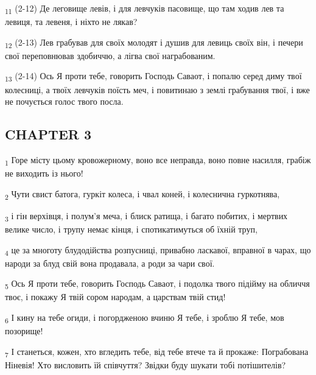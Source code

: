 \begin{tcolorbox}
\textsubscript{11} (2-12) Де леговище левів, і для левчуків пасовище, що там ходив лев та левиця, та левеня, і ніхто не лякав?
\end{tcolorbox}
\begin{tcolorbox}
\textsubscript{12} (2-13) Лев грабував для своїх молодят і душив для левиць своїх він, і печери свої переповнював здобиччю, а лігва свої награбованим.
\end{tcolorbox}
\begin{tcolorbox}
\textsubscript{13} (2-14) Ось Я проти тебе, говорить Господь Саваот, і попалю серед диму твої колесниці, а твоїх левчуків поїсть меч, і повитинаю з землі грабування твої, і вже не почується голос твого посла.
\end{tcolorbox}
\subsection{CHAPTER 3}
\begin{tcolorbox}
\textsubscript{1} Горе місту цьому кровожерному, воно все неправда, воно повне насилля, грабіж не виходить із нього!
\end{tcolorbox}
\begin{tcolorbox}
\textsubscript{2} Чути свист батога, гуркіт колеса, і чвал коней, і колеснична гуркотнява,
\end{tcolorbox}
\begin{tcolorbox}
\textsubscript{3} і гін верхівця, і полум'я меча, і блиск ратища, і багато побитих, і мертвих велике число, і трупу немає кінця, і спотикатимуться об їхній труп,
\end{tcolorbox}
\begin{tcolorbox}
\textsubscript{4} це за многоту блудодійства розпусниці, привабно ласкавої, вправної в чарах, що народи за блуд свій вона продавала, а роди за чари свої.
\end{tcolorbox}
\begin{tcolorbox}
\textsubscript{5} Ось Я проти тебе, говорить Господь Саваот, і подолка твого підійму на обличчя твоє, і покажу Я твій сором народам, а царствам твій стид!
\end{tcolorbox}
\begin{tcolorbox}
\textsubscript{6} І кину на тебе огиди, і погордженою вчиню Я тебе, і зроблю Я тебе, мов позорище!
\end{tcolorbox}
\begin{tcolorbox}
\textsubscript{7} І станеться, кожен, хто вгледить тебе, від тебе втече та й прокаже: Пограбована Ніневія! Хто висловить їй співчуття? Звідки буду шукати тобі потішителів?
\end{tcolorbox}
